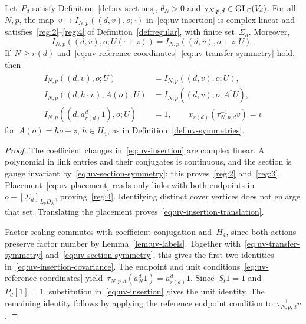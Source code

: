 \begin{proposition}\label{prop:uv-insertions}
Let~$P_d$ satisfy Definition~\ref{def:uv-sections}, $\theta_N>0$ and~$\tau_{N,p,d}\in\mathrm{GL}_\mathbb C(V_d)$.
For all~$N,p$, the map~$v\mapsto I_{N,p}((d,v),o;\cdot)$ in~\eqref{eq:uv-insertion} is complex linear and satisfies~\ref{reg:2}--\ref{reg:4} of Definition~\ref{def:regular}, with finite set~$\Sigma_d$.
Moreover,
\begin{equation}\label{eq:uv-insertion-translation}
 I_{N,p}((d,v),o;U(\cdot+z))=I_{N,p}((d,v),o+z;U)\,.
\end{equation}
If~$N\ge r(d)$ and~\eqref{eq:uv-reference-coordinates}--\eqref{eq:uv-transfer-symmetry} hold, then
\begin{equation}\label{eq:uv-insertion-covariance}
 \begin{aligned}
 I_{N,p}((d,\bar v),o;U)&=\overline{I_{N,p}((d,v),o;U)},\\
 I_{N,p}((d,h\cdot v),A(o);U)&=I_{N,p}((d,v),o;A^*U),\\
 I_{N,p}((d,a_{r(d)}^d1),o;U)&=1,\qquad
 x_{r(d)}(\tau_{N,p,d}^{-1}v)=v
 \end{aligned}
\end{equation}
for~$A(o)=ho+z$, $h\in H_4$, as in Definition~\ref{def:uv-symmetries}.
\end{proposition}

\begin{proof}
The coefficient changes in~\eqref{eq:uv-insertion} are complex linear.
A polynomial in link entries and their conjugates is continuous, and the section is gauge invariant by~\eqref{eq:uv-section-symmetry}; this proves~\ref{reg:2} and~\ref{reg:3}.
Placement~\eqref{eq:uv-placement} reads only links with both endpoints in~$o+[\Sigma_d]_{L_pD_N}$, proving~\ref{reg:4}.
Identifying distinct cover vertices does not enlarge that set.
Translating the placement proves~\eqref{eq:uv-insertion-translation}.

Factor scaling commutes with coefficient conjugation and~$H_4$, since both actions preserve factor number by Lemma~\ref{lem:uv-labels}.
Together with~\eqref{eq:uv-transfer-symmetry} and~\eqref{eq:uv-section-symmetry}, this gives the first two identities in~\eqref{eq:uv-insertion-covariance}.
The endpoint and unit conditions~\eqref{eq:uv-reference-coordinates} yield~$\tau_{N,p,d}(a_N^d1)=a_{r(d)}^d1$.
Since~$S_t1=1$ and~$P_d[1]=1$, substitution in~\eqref{eq:uv-insertion} gives the unit identity.
The remaining identity follows by applying the reference endpoint condition to~$\tau_{N,p,d}^{-1}v$.
\end{proof}

